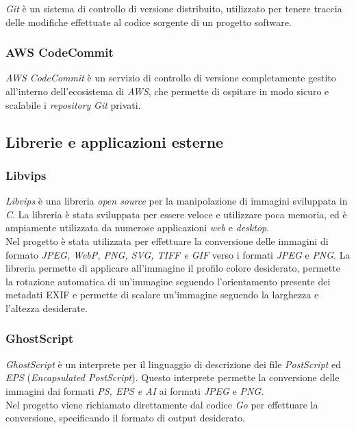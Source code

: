\emph{Git} è un sistema di controllo di versione distribuito, utilizzato per
tenere traccia delle modifiche effettuate al codice sorgente di un progetto
\glsfirstoccur\gls{software}.

\subsubsection{AWS CodeCommit}

\emph{AWS CodeCommit} è un servizio di controllo di versione completamente
gestito all'interno dell'ecosistema di \emph{AWS}, che permette di ospitare in modo sicuro e scalabile i \emph{repository}
\emph{Git} privati. \\

\subsection{Librerie e applicazioni esterne}

\subsubsection{Libvips}

\emph{Libvips} è una libreria \emph{open source} per la manipolazione di immagini
sviluppata in \emph{C}. La libreria è stata sviluppata per essere veloce e
utilizzare poca memoria, ed è ampiamente utilizzata da numerose applicazioni
\emph{web} e \emph{desktop}. \\
Nel progetto è stata utilizzata per effettuare la conversione delle immagini
di formato \emph{JPEG, WebP, PNG, SVG, TIFF e GIF} verso i formati \emph{JPEG} e
\emph{PNG}. La libreria permette di applicare all'immagine il profilo colore
desiderato, permette la rotazione automatica di un'immagine seguendo
l'orientamento presente dei \glsfirstoccur\gls{metadati}
\glsfirstoccur\gls{EXIF} e permette di scalare un'immagine seguendo la larghezza
e l'altezza desiderate. \cite{libvips}

\subsubsection{GhostScript}

\emph{GhostScript} è un interprete per il linguaggio di descrizione dei file
\emph{PostScript} ed \emph{EPS} (\emph{Encapsulated PostScript}).
Questo interprete permette la conversione delle immagini dai formati \emph{PS,
      EPS e AI} ai formati \emph{JPEG} e
\emph{PNG}. \\
Nel progetto viene richiamato direttamente dal codice \emph{Go} per effettuare
la conversione, specificando il formato di output desiderato. \cite{ghostscript}

